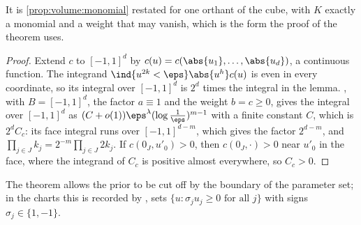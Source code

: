 \begin{refsection}
It is \cref{prop:volume:monomial} restated for one orthant of the cube, with $K$ exactly a monomial and a weight that may vanish, which is the form the proof of the theorem uses.

\begin{proof}
Extend $c$ to $[-1,1]^d$ by $c(u)=c(\abs{u_1},\dots,\abs{u_d})$, a continuous function. The integrand $\ind\{u^{2k}<\eps\}\abs{u^h}c(u)$ is even in every coordinate, so its integral over $[-1,1]^d$ is $2^d$ times the integral in the lemma. , with $B=[-1,1]^d$, the factor $a\equiv1$ and the weight $b=c\ge0$, gives the integral over $[-1,1]^d$ as $(C+o(1))\eps^\lambda(\log\frac1\eps)^{m-1}$ with a finite constant $C$, which is $2^dC_c$: its face integral runs over $[-1,1]^{d-m}$, which gives the factor $2^{d-m}$, and $\prod_{j\in J}k_j=2^{-m}\prod_{j\in J}2k_j$. If $c(0_J,u'_0)>0$, then $c(0_J,\cdot)>0$ near $u'_0$ in the face, where the integrand of $C_c$ is positive almost everywhere, so $C_c>0$.
\end{proof}

The theorem allows the prior to be cut off by the boundary of the parameter set; in the charts this is recorded by , sets $\{u:\sigma_ju_j\ge0\text{ for all }j\}$ with signs $\sigma_j\in\{1,-1\}$.


\end{refsection}
